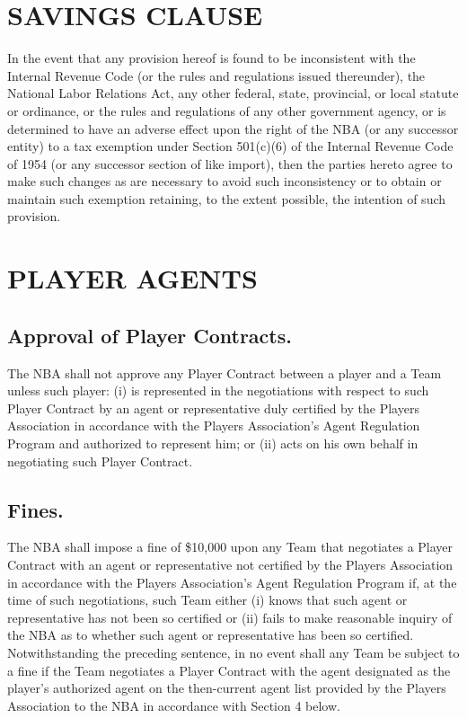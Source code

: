 \documentclass[
]{book}
\begin{document}
\hypertarget{savings-clause}{%
\chapter{SAVINGS CLAUSE}\label{savings-clause}}

In the event that any provision hereof is found to be inconsistent with the Internal Revenue Code (or the rules and regulations issued thereunder), the National Labor Relations Act, any other federal, state, provincial, or local statute or ordinance, or the rules and regulations of any other government agency, or is determined to have an adverse effect upon the right of the NBA (or any successor entity) to a tax exemption under Section 501(c)(6) of the Internal Revenue Code of 1954 (or any successor section of like import), then the parties hereto agree to make such changes as are necessary to avoid such inconsistency or to obtain or maintain such exemption retaining, to the extent possible, the intention of such provision.

\hypertarget{player-agents}{%
\chapter{PLAYER AGENTS}\label{player-agents}}

\hypertarget{approval-of-player-contracts.}{%
\section{Approval of Player Contracts.}\label{approval-of-player-contracts.}}

The NBA shall not approve any Player Contract between a player and a Team unless such player: (i) is represented in the negotiations with respect to such Player Contract by an agent or representative duly certified by the Players Association in accordance with the Players Association's Agent Regulation Program and authorized to represent him; or (ii) acts on his own behalf in negotiating such Player Contract.

\hypertarget{fines.}{%
\section{Fines.}\label{fines.}}

The NBA shall impose a fine of \$10,000 upon any Team that negotiates a Player Contract with an agent or representative not certified by the Players Association in accordance with the Players Association's Agent Regulation Program if, at the time of such negotiations, such Team either (i) knows that such agent or representative has not been so certified or (ii) fails to make reasonable inquiry of the NBA as to whether such agent or representative has been so certified. Notwithstanding the preceding sentence, in no event shall any Team be subject to a fine if the Team negotiates a Player Contract with the agent designated as the player's authorized agent on the then-current agent list provided by the Players Association to the NBA in accordance with Section 4 below.
\end{document}
